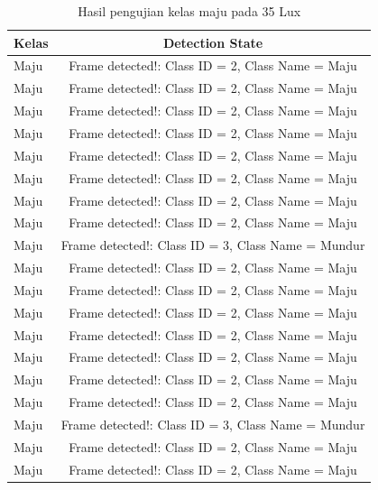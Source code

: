 \begin{longtable}{|l|c|}
  \caption{Hasil pengujian kelas maju pada 35 Lux}
  \label{tb:luxmaju} \\
  \hline
  \rowcolor[HTML]{C0C0C0} 
  \textbf{Kelas} & \textbf{Detection State}                           \\ \hline
  Maju           & Frame detected!: Class ID = 2, Class Name = Maju   \\ \hline
  Maju           & Frame detected!: Class ID = 2, Class Name = Maju   \\ \hline
  Maju           & Frame detected!: Class ID = 2, Class Name = Maju   \\ \hline
  Maju           & Frame detected!: Class ID = 2, Class Name = Maju   \\ \hline
  Maju           & Frame detected!: Class ID = 2, Class Name = Maju   \\ \hline
  Maju           & Frame detected!: Class ID = 2, Class Name = Maju   \\ \hline
  Maju           & Frame detected!: Class ID = 2, Class Name = Maju   \\ \hline
  Maju           & Frame detected!: Class ID = 2, Class Name = Maju   \\ \hline
  Maju           & Frame detected!: Class ID = 3, Class Name = Mundur \\ \hline
  Maju           & Frame detected!: Class ID = 2, Class Name = Maju   \\ \hline
  Maju           & Frame detected!: Class ID = 2, Class Name = Maju   \\ \hline
  Maju           & Frame detected!: Class ID = 2, Class Name = Maju   \\ \hline
  Maju           & Frame detected!: Class ID = 2, Class Name = Maju   \\ \hline
  Maju           & Frame detected!: Class ID = 2, Class Name = Maju   \\ \hline
  Maju           & Frame detected!: Class ID = 2, Class Name = Maju   \\ \hline
  Maju           & Frame detected!: Class ID = 2, Class Name = Maju   \\ \hline
  Maju           & Frame detected!: Class ID = 3, Class Name = Mundur \\ \hline
  Maju           & Frame detected!: Class ID = 2, Class Name = Maju   \\ \hline
  Maju           & Frame detected!: Class ID = 2, Class Name = Maju   \\ \hline

\end{longtable}

